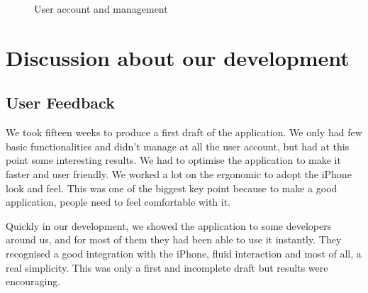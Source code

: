 \documentclass[a4paper, 12pt]{report}
\begin{document}
\begin{figure}[!hp]
  \caption{User account and management}
\end{figure}







\chapter{Discussion about our development}


\section{User Feedback} %

We took fifteen weeks to produce a first draft of the application. We only had few basic functionalities and didn't manage at all the user account, but had at this point some interesting results. We had to optimise the application to make it faster and user friendly. We worked a lot on the ergonomic to adopt the iPhone look and feel. This was one of the biggest key point because to make a good application, people need to feel comfortable with it.

Quickly in our development, we showed the application to some developers around us, and for most of them they had been able to use it instantly. They recognised a good integration with the iPhone, fluid interaction and most of all, a real simplicity. This was only a first and incomplete draft but results were encouraging.
\end{document}
